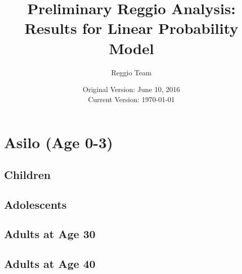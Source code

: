 \documentclass[12pt]{article}
\begin{document}
\title{Preliminary Reggio Analysis: Results for Linear Probability Model}
\author{Reggio Team}
\date{Original Version: June 10, 2016 \\ Current Version: \today}
\maketitle 
\listoftables
\singlespacing

\section{Asilo (Age 0-3)}
\subsection{Children}







\subsection{Adolescents}







\subsection{Adults at Age 30}







\subsection{Adults at Age 40}






\end{document}
